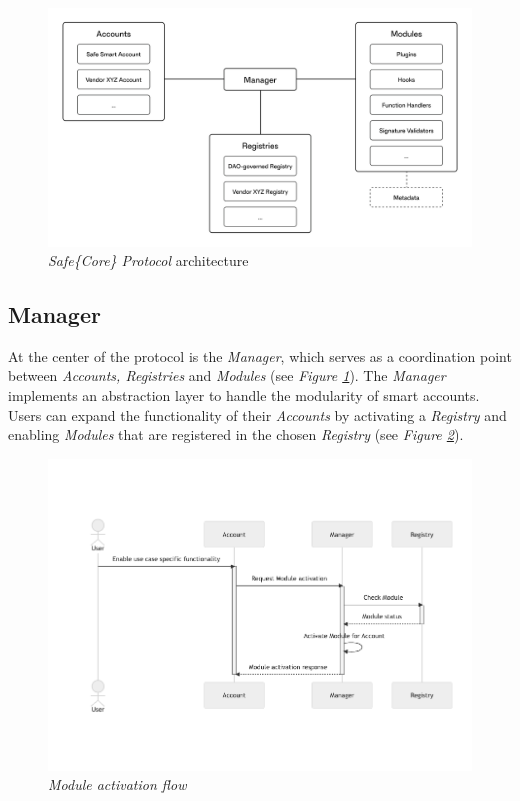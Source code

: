 \documentclass[
]{article}
\begin{document}
\begin{figure}[h]
  \centering
  \includegraphics{graph_architecture.jpg}
  \caption{\emph{Safe\{Core\} Protocol} architecture}
  \label{fig:architecture}
\end{figure}

\hypertarget{manager}{%
  \subsection{Manager}\label{manager}}

At the center of the protocol is the \emph{Manager}, which serves as a coordination point between \emph{Accounts, Registries} and \emph{Modules} (see \emph{Figure \ref{fig:architecture}}). The \emph{Manager} implements an abstraction layer to handle the modularity of smart accounts. Users can expand the functionality of their \emph{Accounts} by activating a \emph{Registry} and enabling \emph{Modules} that are registered in the chosen \emph{Registry} (see \emph{Figure \ref{fig:activate_module}}).


\begin{figure}[h]
  \centering
  \includegraphics{graph_activate_module.png}
  \caption{\emph{Module activation flow}}
  \label{fig:activate_module}
\end{figure}
\end{document}
